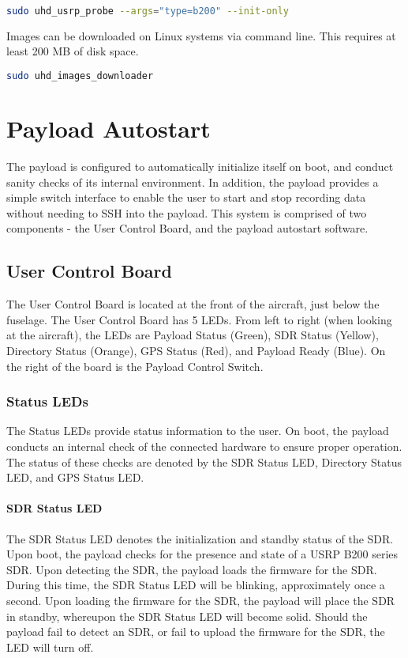 \documentclass{report}
\begin{document}
				\begin{lstlisting}[language=sh]
sudo uhd_usrp_probe --args="type=b200" --init-only
				\end{lstlisting}

				Images can be downloaded on Linux systems via command line.  This requires at least 200 MB of disk space.

				\begin{lstlisting}[language=sh]
sudo uhd_images_downloader
				\end{lstlisting}
		\section{Payload Autostart}
			The payload is configured to automatically initialize itself on boot, and conduct sanity checks of its internal environment.  In addition, the payload provides a simple switch interface to enable the user to start and stop recording data without needing to SSH into the payload.  This system is comprised of two components - the User Control Board, and the payload autostart software.
			\subsection{User Control Board}
				The User Control Board is located at the front of the aircraft, just below the fuselage.  The User Control Board has 5 LEDs.  From left to right (when looking at the aircraft), the LEDs are Payload Status (Green), SDR Status (Yellow), Directory Status (Orange), GPS Status (Red), and Payload Ready (Blue).  On the right of the board is the Payload Control Switch.

				\subsubsection{Status LEDs}
					The Status LEDs provide status information to the user.  On boot, the payload conducts an internal check of the connected hardware to ensure proper operation.  The status of these checks are denoted by the SDR Status LED, Directory Status LED, and GPS Status LED.
					\paragraph{SDR Status LED}
						The SDR Status LED denotes the initialization and standby status of the SDR.  Upon boot, the payload checks for the presence and state of a USRP B200 series SDR.  Upon detecting the SDR, the payload loads the firmware for the SDR.  During this time, the SDR Status LED will be blinking, approximately once a second.  Upon loading the firmware for the SDR, the payload will place the SDR in standby, whereupon the SDR Status LED will become solid.  Should the payload fail to detect an SDR, or fail to upload the firmware for the SDR, the LED will turn off.
\end{document}
